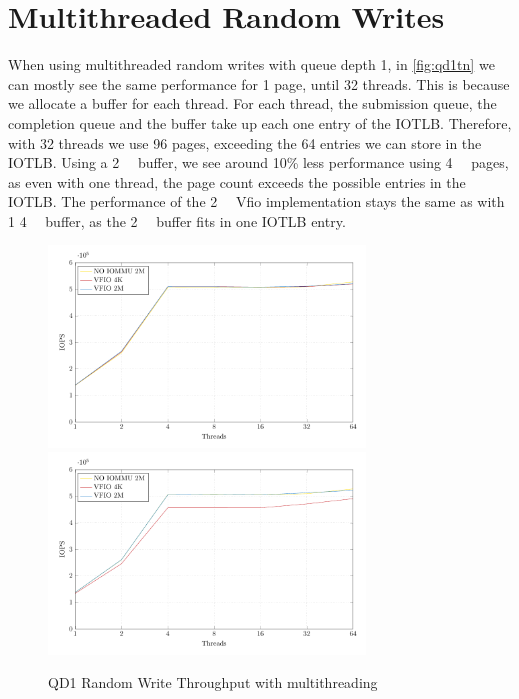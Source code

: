 \section{Multithreaded Random Writes}
When using multithreaded random writes with queue depth 1, in \autoref{fig:qd1tn} we can mostly see the same performance for 1 page, until 32 threads. This is because we allocate a buffer for each thread. For each thread, the submission queue, the completion queue and the buffer take up each one entry of the IOTLB. Therefore, with 32 threads we use 96 pages, exceeding the 64 entries we can store in the IOTLB. Using a \qty{2}{\mebi\byte} buffer, we see around 10\% less performance using \qty{4}{\kibi\byte} pages, as even with one thread, the page count exceeds the possible entries in the IOTLB. The performance of the \qty{2}{\mebi\byte} Vfio implementation stays the same as with 1 \qty{4}{\kibi\byte} buffer, as the \qty{2}{\mebi\byte} buffer fits in one IOTLB entry.


\begin{figure}
    \centering
     {\includegraphics[width=0.75\textwidth]{figures/qd1tn_1page}}
     {\includegraphics[width=0.75\textwidth]{figures/qd1tn_512page}}
    \caption{QD1 Random Write Throughput with multithreading}
    \label{fig:qd1tn}
\end{figure}

